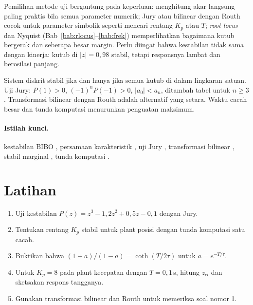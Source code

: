 Pemilihan metode uji bergantung pada keperluan: menghitung akar langsung paling praktis bila semua parameter numerik; Jury atau bilinear dengan Routh cocok untuk parameter simbolik seperti mencari rentang $K_p$ atau $T$; \textit{root locus} dan Nyquist (Bab~\ref{bab:rlocus}--\ref{bab:frek}) memperlihatkan bagaimana kutub bergerak dan seberapa besar margin. Perlu diingat bahwa kestabilan tidak sama dengan kinerja: kutub di $|z| = 0{,}98$ stabil, tetapi responsnya lambat dan berosilasi panjang.

\begin{ringkasan}
	Sistem diskrit stabil jika dan hanya jika semua kutub di dalam lingkaran satuan. Uji Jury: $P(1) > 0$, $(-1)^nP(-1) > 0$, $|a_0| < a_n$, ditambah tabel untuk $n \ge 3$. Transformasi bilinear dengan Routh adalah alternatif yang setara. Waktu cacah besar dan tunda komputasi menurunkan penguatan maksimum.\\[3pt]
\end{ringkasan}

\paragraph{Istilah kunci.} kestabilan BIBO , persamaan karakteristik , uji Jury , transformasi bilinear , stabil marginal , tunda komputasi .

\section*{Latihan}
\begin{enumerate}
	\item Uji kestabilan $P(z) = z^3 - 1{,}2z^2 + 0{,}5z - 0{,}1$ dengan Jury.
	\item Tentukan rentang $K_p$ stabil untuk plant posisi dengan tunda komputasi satu cacah.
	\item Buktikan bahwa $(1+a)/(1-a) = \coth(T/2\tau)$ untuk $a = e^{-T/\tau}$.
	\item Untuk $K_p = 8$ pada plant kecepatan dengan $T = 0{,}1$\,s, hitung $z_{cl}$ dan sketsakan respons tangganya.
	\item Gunakan transformasi bilinear dan Routh untuk memeriksa soal nomor 1.
\end{enumerate}
